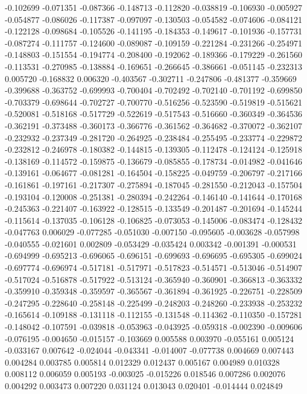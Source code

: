 -0.102699
-0.071351
-0.087366
-0.148713
-0.112820
-0.038819
-0.106930
-0.005927
-0.054877
-0.086026
-0.117387
-0.097097
-0.130503
-0.054582
-0.074606
-0.084121
-0.122128
-0.098684
-0.105526
-0.141195
-0.184353
-0.149617
-0.101936
-0.157731
-0.087274
-0.111757
-0.124600
-0.089087
-0.109159
-0.221284
-0.231266
-0.254971
-0.148803
-0.151554
-0.194774
-0.208400
-0.192062
-0.189366
-0.179229
-0.261560
-0.113531
-0.270985
-0.138884
-0.169651
-0.266645
-0.386661
-0.051145
-0.232313
0.005720
-0.168832
0.006320
-0.403567
-0.302711
-0.247806
-0.481377
-0.359669
-0.399688
-0.363752
-0.699993
-0.700404
-0.702492
-0.702140
-0.701192
-0.699850
-0.703379
-0.698644
-0.702727
-0.700770
-0.516256
-0.523590
-0.519819
-0.515621
-0.520081
-0.518168
-0.517729
-0.522619
-0.517543
-0.516660
-0.360349
-0.364536
-0.362191
-0.373488
-0.360173
-0.366776
-0.361562
-0.364682
-0.370072
-0.362107
-0.232932
-0.237349
-0.281720
-0.264925
-0.238484
-0.255495
-0.233774
-0.229872
-0.232812
-0.246978
-0.180382
-0.144815
-0.139305
-0.112478
-0.124124
-0.125918
-0.138169
-0.114572
-0.159875
-0.136679
-0.085855
-0.178734
-0.014982
-0.041646
-0.139161
-0.064677
-0.081281
-0.164504
-0.158225
-0.049759
-0.206797
-0.217166
-0.161861
-0.197161
-0.217307
-0.275894
-0.187045
-0.281550
-0.212043
-0.157504
-0.193104
-0.120008
-0.251381
-0.280394
-0.242264
-0.146140
-0.141644
-0.170168
-0.245363
-0.221407
-0.163922
-0.128515
-0.133549
-0.201487
-0.201694
-0.145244
-0.115614
-0.137035
-0.106128
-0.106825
-0.073053
-0.145006
-0.083474
-0.128432
-0.047763
0.006029
-0.077285
-0.051030
-0.007150
-0.095605
-0.003628
-0.057998
-0.040555
-0.021601
0.002809
-0.053429
-0.035424
0.003342
-0.001391
-0.000531
-0.694999
-0.695213
-0.696065
-0.696151
-0.699693
-0.696695
-0.695305
-0.699024
-0.697774
-0.696974
-0.517181
-0.517971
-0.517823
-0.514571
-0.513046
-0.514907
-0.517024
-0.516878
-0.517922
-0.513124
-0.365940
-0.360901
-0.366813
-0.363332
-0.359910
-0.359348
-0.359597
-0.365567
-0.361894
-0.361925
-0.226751
-0.228509
-0.247295
-0.228640
-0.258148
-0.225499
-0.248203
-0.248260
-0.233938
-0.253232
-0.165614
-0.109188
-0.131118
-0.112155
-0.131548
-0.114362
-0.110350
-0.157281
-0.148042
-0.107591
-0.039818
-0.053963
-0.043925
-0.059318
-0.002390
-0.009606
-0.076195
-0.004650
-0.015157
-0.103669
0.005588
0.003970
-0.055161
0.005124
-0.033167
0.007642
-0.024044
-0.043341
-0.014007
-0.077738
0.004669
0.007443
0.004284
0.003785
0.005814
0.012329
0.012437
0.005167
0.004989
0.010328
0.008112
0.006059
0.005193
-0.003025
-0.015226
0.018546
0.007286
0.002076
0.004292
0.003473
0.007220
0.031124
0.013043
0.020401
-0.014444
0.024849
